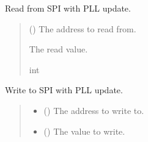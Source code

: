 \documentclass[letterpaper,10pt,english]{sphinxmanual}
\begin{document}
\begin{fulllineitems}
\begin{fulllineitems}
\begin{quote}
\begin{description}
\end{description}\end{quote}

\end{fulllineitems}



\begin{fulllineitems}

\pysigstartsignatures
{}
\pysigstopsignatures
\sphinxAtStartPar
Read from SPI with PLL update.
\begin{quote}\begin{description}
\sphinxAtStartPar
{} () \textendash{} The address to read from.

\sphinxAtStartPar
The read value.

\sphinxAtStartPar
int

\end{description}\end{quote}

\end{fulllineitems}



\begin{fulllineitems}

\pysigstartsignatures
{}
\pysigstopsignatures
\sphinxAtStartPar
Write to SPI with PLL update.
\begin{quote}\begin{description}
\begin{itemize}
\item {} 
\sphinxAtStartPar
{} () \textendash{} The address to write to.

\item {} 
\sphinxAtStartPar
{} () \textendash{} The value to write.

\end{itemize}

\end{description}\end{quote}


\end{fulllineitems}
\end{fulllineitems}
\end{document}
